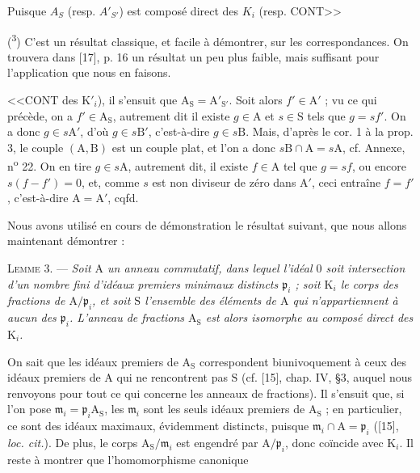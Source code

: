 Puisque $A_S$ (resp. $A'_{S'}$) est composé direct des $K_i$ (resp. CONT>>

(\textsuperscript{3}) C'est un résultat classique, et facile à démontrer, sur les correspondances. On trouvera dans [17], p. 16 un résultat un peu plus faible, mais suffisant pour l'application que nous en faisons.



<<CONT des $\mathrm{K}'_i$), il s'ensuit que $\mathrm{A}_\mathrm{S} = \mathrm{A}'_{\mathrm{S}'}$. Soit alors $f' \in \mathrm{A}'$ ; vu ce qui précède, on a $f' \in \mathrm{A}_\mathrm{S}$, autrement dit il existe $g \in \mathrm{A}$ et $s \in \mathrm{S}$ tels que $g = sf'$. On a donc $g \in s\mathrm{A}'$, d'où $g \in s\mathrm{B}'$, c'est-à-dire $g \in s\mathrm{B}$. Mais, d'après le cor. 1 à la prop. 3, le couple $(\mathrm{A}, \mathrm{B})$ est un couple plat, et l'on a donc $s\mathrm{B} \cap \mathrm{A} = s\mathrm{A}$, cf. Annexe, n\textsuperscript{o} 22. On en tire $g \in s\mathrm{A}$, autrement dit, il existe $f \in \mathrm{A}$ tel que $g = sf$, ou encore $s(f - f') = 0$, et, comme $s$ est non diviseur de zéro dans $\mathrm{A}'$, ceci entraîne $f = f'$, c'est-à-dire $\mathrm{A} = \mathrm{A}'$, cqfd.

Nous avons utilisé en cours de démonstration le résultat suivant, que nous allons maintenant démontrer :

\textsc{Lemme} 3. --- \emph{Soit $\mathrm{A}$ un anneau commutatif, dans lequel l'idéal $0$ soit intersection d'un nombre fini d'idéaux premiers minimaux distincts $\mathfrak{p}_i$ ; soit $\mathrm{K}_i$ le corps des fractions de $\mathrm{A}/\mathfrak{p}_i$, et soit $\mathrm{S}$ l'ensemble des éléments de $\mathrm{A}$ qui n'appartiennent à aucun des $\mathfrak{p}_i$. L'anneau de fractions $\mathrm{A}_\mathrm{S}$ est alors isomorphe au composé direct des $\mathrm{K}_i$.}

On sait que les idéaux premiers de $\mathrm{A}_\mathrm{S}$ correspondent biunivoquement à ceux des idéaux premiers de $\mathrm{A}$ qui ne rencontrent pas $\mathrm{S}$ (cf. [15], chap. IV, \S 3, auquel nous renvoyons pour tout ce qui concerne les anneaux de fractions). Il s'ensuit que, si l'on pose $\mathfrak{m}_i = \mathfrak{p}_i \mathrm{A}_\mathrm{S}$, les $\mathfrak{m}_i$ sont les seuls idéaux premiers de $\mathrm{A}_\mathrm{S}$ ; en particulier, ce sont des idéaux maximaux, évidemment distincts, puisque $\mathfrak{m}_i \cap \mathrm{A} = \mathfrak{p}_i$ ([15], \emph{loc. cit.}). De plus, le corps $\mathrm{A}_\mathrm{S}/\mathfrak{m}_i$ est engendré par $\mathrm{A}/\mathfrak{p}_i$, donc coïncide avec $\mathrm{K}_i$. Il reste à montrer que l'homomorphisme canonique

